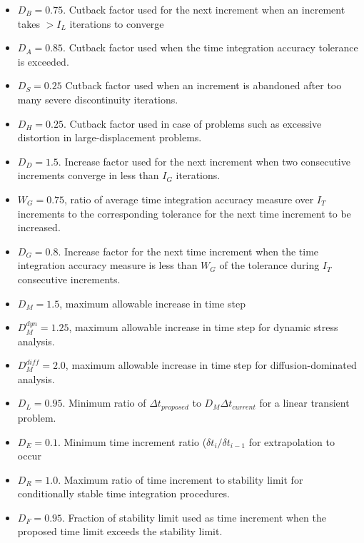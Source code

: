 \documentclass[10pt,letterpaper,oneside]{report}
\begin{document}
\begin{itemize}
\item $D_B = 0.75$.  Cutback factor used for the next increment when an increment takes $> I_L$ iterations to converge
\item $D_A = 0.85$.  Cutback factor used when the time integration accuracy tolerance is exceeded.
\item $D_S = 0.25 $  Cutback factor used when an increment is abandoned after too many severe discontinuity iterations. 
\item $D_H = 0.25$.  Cutback factor used in case of problems such as excessive distortion in large-displacement problems.  
\item $D_D = 1.5$.  Increase factor used for the next increment when two consecutive increments converge in less than $I_G$ iterations.
\item $W_G = 0.75$, ratio of average time integration accuracy measure over $I_T$ increments to the corresponding tolerance for the next time increment to be increased.
\item $D_G = 0.8$.  Increase factor for the next time increment when the time integration accuracy measure is less than $W_G$ of the tolerance during $I_T$ consecutive increments.
\item $D_M = 1.5$, maximum allowable increase in time step
\item $D_M^{dyn} = 1.25$, maximum allowable increase in time step for dynamic stress analysis.
\item $D_M^{diff} = 2.0$, maximum allowable increase in time step for diffusion-dominated analysis.
\item $D_L = 0.95$.  Minimum ratio of $\Delta t_{proposed}$ to $D_M \Delta t_{current}$ for a linear transient problem.
\item $D_E = 0.1$.  Minimum time increment ratio ($\delta t_i / \delta t_{i-1}$ for extrapolation to occur
\item $D_R = 1.0$.  Maximum ratio of time increment to stability limit for conditionally stable time integration procedures.
\item $D_F = 0.95$.  Fraction of stability limit used as time increment when the proposed time limit exceeds the stability limit. 
\end{itemize}



\end{document}
